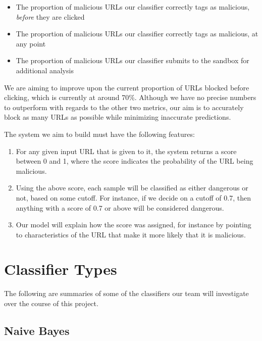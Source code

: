 \documentclass[cs,proposal]{hmcclinic}
\begin{document}
\begin{itemize} \itemsep0em
\item The proportion of malicious URLs our classifier correctly tags as malicious, \textit{before} they are clicked
\item The proportion of malicious URLs our classifier correctly tags as malicious, at any point
\item The proportion of malicious URLs our classifier submits to the sandbox for additional analysis
\end{itemize}

We are aiming to improve upon the current proportion of URLs blocked before clicking, which is currently at around 70\%. Although we have no precise numbers to outperform with regards to the other two metrics, our aim is to accurately block as many URLs as possible while minimizing inaccurate predictions.

The system we aim to build must have the following features:

\begin{enumerate} \itemsep0em
\item For any given input URL that is given to it, the system returns a score between 0 and 1, where the score indicates the probability of the URL being malicious.
\item Using the above score, each sample will be classified as either dangerous or not, based on some cutoff. For instance, if we decide on a cutoff of 0.7, then anything with a score of 0.7 or above will be considered dangerous.
\item Our model will explain how the score was assigned, for instance by pointing to characteristics of the URL that make it more likely that it is malicious.
\end{enumerate}


\section{Classifier Types}

The following are summaries of some of the classifiers our team will investigate over the course of this project.

\subsection{Naive Bayes}
\end{document}
